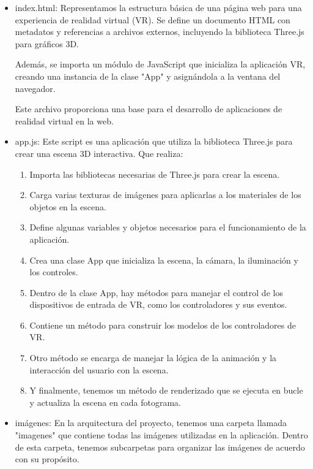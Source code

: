 \documentclass[a4paper, 12pt]{book}
\begin{document}
\begin{itemize}
  \item index.html: Representamos la estructura básica de una página web para una experiencia de realidad virtual (VR). 
  Se define un documento HTML con metadatos y referencias a archivos externos, incluyendo la biblioteca Three.js para gráficos 3D. 
  
  Además, se importa un módulo de JavaScript que inicializa la aplicación VR, creando una instancia de la clase "App" y asignándola a la ventana del navegador. 
  
  Este archivo proporciona una base para el desarrollo de aplicaciones de realidad virtual en la web.
  
  \item app.js: Este script es una aplicación que utiliza la biblioteca Three.js para crear una escena 3D interactiva. Que realiza:
    
    \begin{enumerate}
      \item Importa las bibliotecas necesarias de Three.js para crear la escena.
      \item Carga varias texturas de imágenes para aplicarlas a los materiales de los objetos en la escena.
      \item Define algunas variables y objetos necesarios para el funcionamiento de la aplicación.
      \item Crea una clase App que inicializa la escena, la cámara, la iluminación y los controles.
      \item Dentro de la clase App, hay métodos para manejar el control de los dispositivos de entrada de VR, como los controladores y sus eventos.
      \item Contiene un método para construir los modelos de los controladores de VR.
      \item Otro método se encarga de manejar la lógica de la animación y la interacción del usuario con la escena.
      \item Y finalmente, tenemos un método de renderizado que se ejecuta en bucle y actualiza la escena en cada fotograma.
    \end{enumerate}

  \item imágenes: En la arquitectura del proyecto, tenemos una carpeta llamada "imagenes" que contiene todas las imágenes utilizadas en la aplicación. 
  Dentro de esta carpeta, tenemos subcarpetas para organizar las imágenes de acuerdo con su propósito.


\end{itemize}
\end{document}
